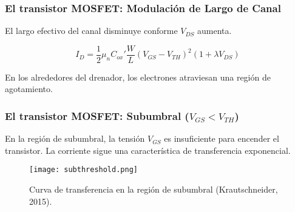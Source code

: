 \begin{frame}[t]
    \frametitle{El transistor MOSFET: Modulación de Largo de Canal}

    \centering
    \begin{figure}[H]
    \end{figure}

    \flushleft
    El largo efectivo del canal disminuye conforme $V_{DS}$ aumenta.

    \[ I_D = \dfrac{1}{2} \mu_n C_{ox}' \dfrac{W}{L} (V_{GS}-V_{TH})^2 (1 + \lambda V_{DS}) \]

    En los alrededores del drenador, los electrones atraviesan una región de agotamiento.
\end{frame}

\begin{frame}[t]
    \frametitle{El transistor MOSFET: Subumbral ($V_{GS}<V_{TH}$)}

    En la región de subumbral, la tensión $V_{GS}$ es insuficiente para encender el transistor. La corriente sigue una característica de transferencia exponencial.

    \vspace{5mm}
    \begin{figure}[H]
        \centering
        \texttt{[image: subthreshold.png]}
        \caption{Curva de transferencia en la región de subumbral (Krautschneider, 2015).}
    \end{figure}
           
\end{frame}


